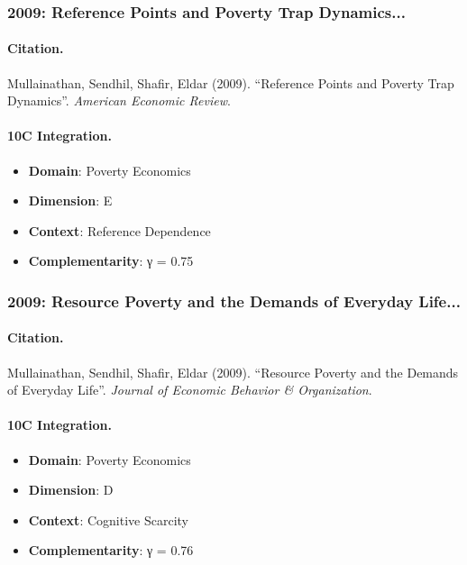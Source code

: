 \subsubsection{2009: Reference Points and Poverty Trap Dynamics...}

\paragraph{Citation.}
Mullainathan, Sendhil, Shafir, Eldar (2009). ``Reference Points and Poverty Trap Dynamics''. \textit{American Economic Review}.

\paragraph{10C Integration.}
\begin{itemize}[nosep]
  \item \textbf{Domain}: Poverty Economics
  \item \textbf{Dimension}: E
  \item \textbf{Context}: Reference Dependence
  \item \textbf{Complementarity}: γ = 0.75
\end{itemize}


\subsubsection{2009: Resource Poverty and the Demands of Everyday Life...}

\paragraph{Citation.}
Mullainathan, Sendhil, Shafir, Eldar (2009). ``Resource Poverty and the Demands of Everyday Life''. \textit{Journal of Economic Behavior & Organization}.

\paragraph{10C Integration.}
\begin{itemize}[nosep]
  \item \textbf{Domain}: Poverty Economics
  \item \textbf{Dimension}: D
  \item \textbf{Context}: Cognitive Scarcity
  \item \textbf{Complementarity}: γ = 0.76
\end{itemize}


